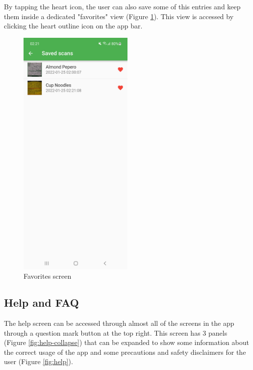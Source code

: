 By tapping the heart icon, the user can also save some of this entries and keep them inside a dedicated "favorites" view (Figure \ref{fig:favs}). This view is accessed by clicking the heart outline icon on the app bar.

\begin{figure}[h]
  \centering
  \includegraphics[width=0.5\textwidth]{Figures/Screenshot/favs.jpg}
  \caption{%
    Favorites screen
  }
  \label{fig:favs}
\end{figure}

\clearpage

\subsection{Help and FAQ}

The help screen can be accessed through almost all of the screens in the app through a question mark button at the top right. This screen has 3 panels (Figure \ref{fig:help-collapse}) that can be expanded to show some information about the correct usage of the app and some precautions and safety disclaimers for the user (Figure \ref{fig:help}).


